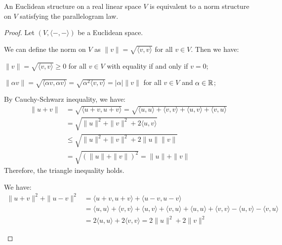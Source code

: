\begin{proposition}
	An Euclidean structure on a real linear space $V$ is equivalent to a norm structure on $V$ satisfying the parallelogram law.
\end{proposition}
\begin{proof}
	Let $(V, \langle -, - \rangle)$ be a Euclidean space.
	\begin{description}[labelwidth=\widthof{\bfseries ($\Rightarrow$):~}]
		\item[($\Rightarrow$)] We can define the norm on $V$ as $\| v \| = \sqrt{\langle v, v \rangle}$ for all $v \in V$. Then we have:
		      \begin{description}[labelwidth=\widthof{\bfseries Positive-definiteness:~}]
			      \item[Positive-definiteness] $\| v \| = \sqrt{\langle v, v \rangle} \geq 0$ for all $v \in V$ with equality if and only if $v = 0$;
			      \item[Homogeneity] $\| \alpha v \| = \sqrt{\langle \alpha v, \alpha v \rangle} = \sqrt{\alpha^2 \langle v, v \rangle} = |\alpha| \| v \|$ for all $v \in V$ and $\alpha \in \operatorname{\mathbb{R}}$;
			      \item[Triangle Inequality] By Cauchy-Schwarz inequality, we have:
			            \begin{align*}
				            \| u + v \| & = \sqrt{\langle u + v, u + v \rangle} = \sqrt{\langle u, u \rangle + \langle v, v \rangle + \langle u, v \rangle + \langle v, u \rangle} \\
				                        & = \sqrt{\| u \|^2 + \| v \|^2 + 2 \langle u, v \rangle}                                                                                  \\
				                        & \leq \sqrt{\| u \|^2 + \| v \|^2 + 2 \| u \| \| v \|}                                                                                    \\
				                        & = \sqrt{{(\| u \| + \| v \|)}^2} = \| u \| + \| v \|
			            \end{align*}
			            Therefore, the triangle inequality holds.
			      \item[Parallelogram Law] We have:
			            \begin{align*}
				            \| u + v \|^2 + \| u - v \|^2 & = \langle u + v, u + v \rangle + \langle u - v, u - v \rangle                                                                                                                           \\
				                                          & = \langle u, u \rangle + \langle v, v \rangle + \langle u, v \rangle + \langle v, u \rangle + \langle u, u \rangle + \langle v, v \rangle - \langle u, v \rangle - \langle v, u \rangle \\
				                                          & = 2 \langle u, u \rangle + 2 \langle v, v \rangle = 2 \| u \|^2 + 2 \| v \|^2
			            \end{align*}
		      \end{description}


\end{description}
\end{proof}
